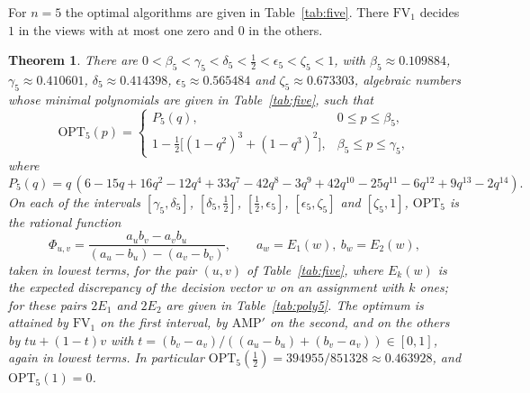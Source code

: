 \documentclass[11pt]{article}
\newtheorem{theorem}{Theorem}
\newcommand{\OPT}{\mathrm{OPT}}
\newcommand{\h}{\tfrac12}
\begin{document}
For $n=5$ the optimal algorithms are given in Table~\ref{tab:five}. There $\mathrm{FV}_1$ decides $1$ in the views with at most one zero and $0$ in the others.

\begin{theorem}\label{thm:five}
There are $0<\beta_5<\gamma_5<\delta_5<\h<\epsilon_5<\zeta_5<1$, with $\beta_5\approx0.109884$, $\gamma_5\approx0.410601$, $\delta_5\approx0.414398$, $\epsilon_5\approx0.565484$ and $\zeta_5\approx0.673303$, algebraic numbers whose minimal polynomials are given in Table~\ref{tab:five}, such that
\[
\OPT_5(p)=\begin{cases}
P_5(q), & 0\le p\le\beta_5,\\[2pt]
1-\h\bigl[(1-q^2)^3+(1-q^3)^2\bigr], & \beta_5\le p\le\gamma_5,
\end{cases}
\]
where
\[
P_5(q)=q\,(6-15q+16q^2-12q^4+33q^7-42q^8-3q^9+42q^{10}-25q^{11}-6q^{12}+9q^{13}-2q^{14}).
\]
On each of the intervals $[\gamma_5,\delta_5]$, $[\delta_5,\h]$, $[\h,\epsilon_5]$, $[\epsilon_5,\zeta_5]$ and $[\zeta_5,1]$, $\OPT_5$ is the rational function
\begin{equation}\label{eq:mix}
\Phi_{u,v}=\frac{a_ub_v-a_vb_u}{(a_u-b_u)-(a_v-b_v)},\qquad a_w=E_1(w),\ b_w=E_2(w),
\end{equation}
taken in lowest terms, for the pair $(u,v)$ of Table~\ref{tab:five}, where $E_k(w)$ is the expected discrepancy of the decision vector $w$ on an assignment with $k$ ones; for these pairs $2E_1$ and $2E_2$ are given in Table~\ref{tab:poly5}. The optimum is attained by $\mathrm{FV}_1$ on the first interval, by $\mathrm{AMP}'$ on the second, and on the others by $tu+(1-t)v$ with $t=(b_v-a_v)/((a_u-b_u)+(b_v-a_v))\in[0,1]$, again in lowest terms. In particular $\OPT_5(\h)=394955/851328\approx0.463928$, and $\OPT_5(1)=0$.
\end{theorem}
\end{document}
